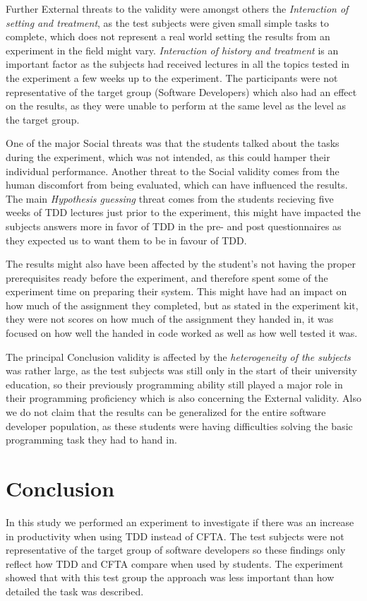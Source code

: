 \documentclass{sig-alternate-05-2015}
\begin{document}
Further External threats to the validity were amongst others the \textit{Interaction of setting and treatment}, as the test subjects were given small simple tasks to complete, which does not represent a real world setting the results from an experiment in the field might vary. \textit{Interaction of history and treatment} is an important factor as the subjects had received lectures in all the topics tested in the experiment a few weeks up to the experiment. The participants were not representative of the target group (Software Developers) which also had an effect on the results, as they were unable to perform at the same level as the level as the target group.

One of the major Social threats was that the students talked about the tasks during the experiment, which was not intended, as this could hamper their individual performance. Another threat to the Social validity comes from the human discomfort from being evaluated\cite{henchy1}, which can have influenced the results. The main \textit{Hypothesis guessing} threat comes from the students recieving five  weeks of TDD lectures just prior to the experiment, this might have impacted the subjects answers more in favor of TDD in the pre- and post questionnaires as they expected us to want them to be in favour of TDD. 

The results might also have been affected by the student's not having the proper prerequisites ready before the experiment, and therefore spent some of the experiment time on preparing their system. This might have had an impact on how much of the assignment they completed, but as stated in the experiment kit, they were not scores on how much of the assignment they handed in, it was focused on how well the handed in code worked as well as how well tested it was.

The principal Conclusion validity is affected by the \textit{heterogeneity of the subjects} was rather large, as the test subjects was still only in the start of their university education, so their previously programming ability still played a major role in their programming proficiency which is also concerning the External validity. Also we do not claim that the results can be generalized for the entire software developer population, as these students were having difficulties solving the basic programming task they had to hand in. 

\section{Conclusion}
\label{sec:Conclusion}
In this study we performed an experiment to investigate if there was an increase in productivity when using TDD instead of CFTA. The test subjects were not representative of the target group of software developers so these findings only reflect how TDD and CFTA compare when used by students. The experiment showed that with this test group the approach was less important than how detailed the task was described.
\end{document}
